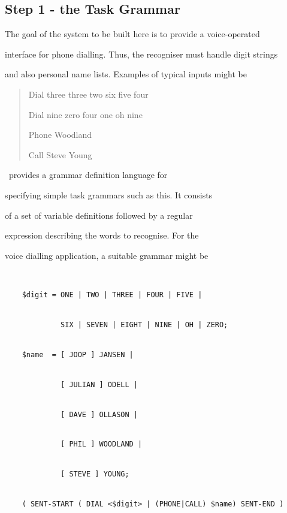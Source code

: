 \subsection{Step 1 - the Task Grammar}





The goal of the system to be built here is to provide a voice-operated


interface for phone dialling. Thus, the recogniser must handle digit strings


and also personal name lists. Examples of typical inputs might be


\begin{quote}


Dial three three two six five four





Dial nine zero four one oh nine





Phone Woodland





Call Steve Young


\end{quote}





\HTK\ provides a grammar definition language for


specifying simple task grammars such as this.  It consists


of a set of variable definitions followed by a regular 


expression describing the words to recognise.  For the


voice dialling application, a suitable grammar might be


\begin{verbatim}


    $digit = ONE | TWO | THREE | FOUR | FIVE |


             SIX | SEVEN | EIGHT | NINE | OH | ZERO;


    $name  = [ JOOP ] JANSEN |


             [ JULIAN ] ODELL |


             [ DAVE ] OLLASON |


             [ PHIL ] WOODLAND | 


             [ STEVE ] YOUNG;


    ( SENT-START ( DIAL <$digit> | (PHONE|CALL) $name) SENT-END )


\end{verbatim}



